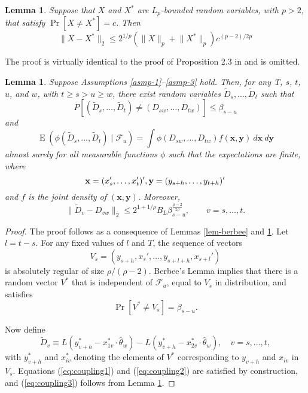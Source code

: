 \documentclass[11pt]{article}
\newtheorem{lem}[thm]{Lemma}
\DeclareMathOperator{\E}{E}
\newcommand{\h}{h}
\newcommand{\rhoExp}{\ensuremath{\frac{\rho-2}{2\rho}}}
\begin{document}
\begin{lem}\label{lem-extend-mp}
  Suppose that $X$ and $X^*$ are $L_p$-bounded random variables, with
  $p > 2$, that satisfy ${\Pr[X \neq X^*] = c}$.  Then
  \[
    \lVert X - X^* \rVert_2 \leq 2^{1/p} (\lVert X \rVert_p + \lVert
    X^* \rVert_p) c^{(p-2)/2p}
  \]
\end{lem}

The proof is virtually identical to the proof of Proposition 2.3 in
\citet{MeP:02} and is omitted.

\begin{lem}\label{lem-basic-coupling}
  Suppose Assumptions \ref{asmp-1}--\ref{asmp-3} hold.  Then, for any
  T, $s$, $t$, $u$, and $w$, with $t \geq s > u \geq w$, there exist random
  variables $\tilde D_s,\dots,\tilde D_t$ such that
  \begin{equation}\label{eq:coupling1}
    P[(\tilde D_s,\dots,\tilde D_t) \neq (D_{sw},\dots,D_{tw})] \leq \beta_{s-u}
  \end{equation}
  and
  \begin{equation}\label{eq:coupling2}
    \E(\phi(\tilde D_s,\dots, \tilde D_t) \mid \mathcal{F}_u ) = 
    \int
    \phi(D_{sw},\dots,D_{tw}) f(\mathbf{x}, \mathbf{y})\ d\mathbf{x}\ d\mathbf{y}
  \end{equation}
  almost surely for all measurable functions $\phi$ such that the
  expectations are finite, where 
  \[ \mathbf{x} = (x_{s}', \dots, x_{t}')', \\
  \mathbf{y} = (y_{s+\h},\dots,y_{t+\h})'\] and $f$ is the
  joint density of $(\mathbf{x}, \mathbf{y})$.  Moreover,
 \begin{equation}\label{eq:coupling3}
   \| \tilde D_v - D_{vw} \|_2 \leq 2^{1+1/\rho} B_L
   \beta_{s-u}^\rhoExp, \qquad v = s,\dots,t.
 \end{equation}
\end{lem}

\begin{proof}
  The proof follows as a consequence of Lemmas \ref{lem-berbee} and
  \ref{lem-extend-mp}.  Let $l = t-s$.  For any fixed values of $l$
  and $T$, the sequence of vectors
  \[ V_s = (y_{s+\h}, x_{s}', \dots, y_{s+l+\h}, x_{s+l}') \] is
  absolutely regular of size $\rho/(\rho-2)$.  Berbee's Lemma implies
  that there is a random vector $V^*$ that is independent of
  $\mathcal{F}_u$, equal to $V_s$ in distribution, and satisfies
  \[\Pr[V^* \neq V_s] = \beta_{s-u}.\]

  Now define
  \[ \tilde D_v \equiv L(y_{v+\h}^* - x_{1v}^* \cdot
  \hat{\theta}_w) - L(y_{v+\h}^* - x_{2v}^* \cdot
  \hat{\theta}_w), \quad v = s,\dotsc, t,
  \]
  with $y_{v+\h}^*$ and $x_{iv}^*$ denoting the elements of $V^*$
  corresponding to $y_{v+\h}$ and $x_{iv}$ in $V_s$.  Equations
  (\ref{eq:coupling1}) and (\ref{eq:coupling2}) are satisfied by
  construction, and (\ref{eq:coupling3}) follows from Lemma
  \ref{lem-extend-mp}.
\end{proof}
\end{document}
